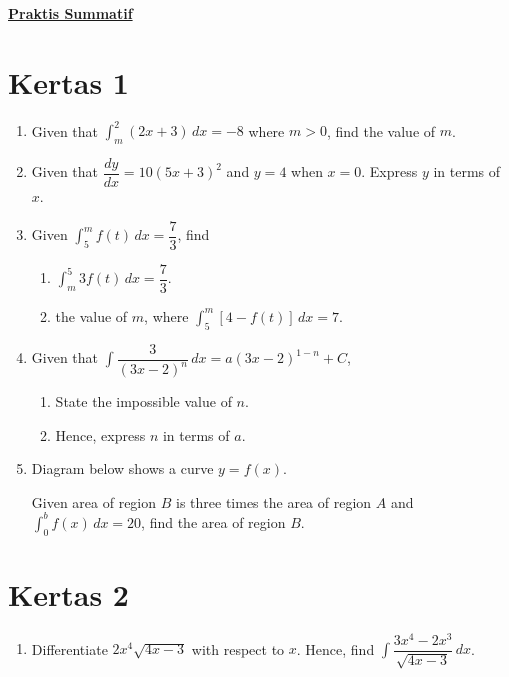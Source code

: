 \documentclass{report}
\begin{document}
\begin{multicols*}{2}
      \noindent\Large{\underline{\textbf{Praktis Summatif}}}
      \normalsize
      \setcounter{section}{0}
      \section{Kertas 1}

      \begin{enumerate}
            \item Given that $\displaystyle \int_m^2(2x+3)\,dx = -8$ where $m > 0$, find the
                  value of $m$.

            \item Given that $\dfrac{dy}{dx} = 10{(5x + 3)}^2$ and $y = 4$ when $x = 0$. Express
                  $y$ in terms of $x$.

            \item Given $\displaystyle \int_5^m f(t)\,dx = \dfrac{7}{3}$, find
                  \begin{enumerate}
                        \item $\displaystyle \int_m^5 3f(t)\,dx  = \dfrac{7}{3}$.

                        \item the value of $m$, where $\displaystyle \int_5^m [4-f(t)]\,dx = 7$.
                  \end{enumerate}

            \item Given that $\displaystyle \int \dfrac{3}{{(3x-2)}^n}\,dx = a{(3x-2)}^{1-n} +
                        C$,
                  \begin{enumerate}
                        \item State the impossible value of $n$.

                        \item Hence, express $n$ in terms of $a$.
                  \end{enumerate}

            \item Diagram below shows a curve $y = f(x)$.

                  Given area of region $B$ is three times the area of region $A$ and
                  $\displaystyle \int_0^b f(x)\,dx = 20$, find the area of region $B$.
      \end{enumerate}

      \section{Kertas 2}
      \begin{enumerate}
            \item Differentiate $2x^4\sqrt{4x-3}$ with respect to $x$. Hence, find $\displaystyle
                        \int \dfrac{3x^4 - 2x^3}{\sqrt{4x-3}}\,dx$.


\end{enumerate}
\end{multicols*}
\end{document}

